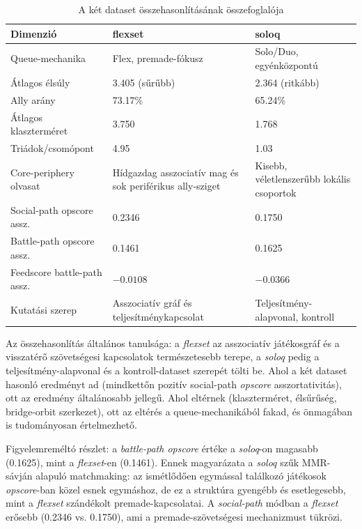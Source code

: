 \begin{table}[H]
\centering
\caption{A két dataset összehasonlításának összefoglalója}
\begin{tabularx}{\textwidth}{>{\raggedright\arraybackslash}p{5cm} X X}
\toprule
\textbf{Dimenzió} & \textbf{flexset} & \textbf{soloq} \\
\midrule
Queue-mechanika & Flex, premade-fókusz & Solo/Duo, egyénközpontú \\
Átlagos élsúly & 3.405 (sűrűbb) & 2.364 (ritkább) \\
Ally arány & 73.17\% & 65.24\% \\
Átlagos klaszterméret & 3.750 & 1.768 \\
Triádok/csomópont & 4.95 & 1.03 \\
Core-periphery olvasat & Hídgazdag asszociatív mag és sok periférikus ally-sziget & Kisebb, véletlenszerűbb lokális csoportok \\
Social-path opscore assz. & 0.2346 & 0.1750 \\
Battle-path opscore assz. & 0.1461 & 0.1625 \\
Feedscore battle-path assz. & $-0.0108$ & $-0.0366$ \\
Kutatási szerep & Asszociatív gráf és teljesítménykapcsolat & Teljesítmény-alapvonal, kontroll \\
\bottomrule
\end{tabularx}
\end{table}

Az összehasonlítás általános tanulsága: a \textit{flexset} az asszociatív játékosgráf és a visszatérő szövetségesi kapcsolatok természetesebb terepe, a \textit{soloq} pedig a teljesítmény-alapvonal és a kontroll-dataset szerepét tölti be. Ahol a két dataset hasonló eredményt ad (mindkettőn pozitív social-path \textit{opscore} asszortativitás), ott az eredmény általánosabb jellegű. Ahol eltérnek (klaszterméret, élsűrűség, bridge-orbit szerkezet), ott az eltérés a queue-mechanikából fakad, és önmagában is tudományosan értelmezhető.

Figyelemreméltó részlet: a \textit{battle-path opscore} értéke a \textit{soloq}-on magasabb (0.1625), mint a \textit{flexset}-en (0.1461). Ennek magyarázata a \textit{soloq} szűk MMR-sávján alapuló matchmaking: az ismétlődően egymással találkozó játékosok \textit{opscore}-ban közel esnek egymáshoz, de ez a struktúra gyengébb és esetlegesebb, mint a \textit{flexset} szándékolt premade-kapcsolatai. A \textit{social-path} módban a \textit{flexset} erősebb (0.2346 vs. 0.1750), ami a premade-szövetségesi mechanizmust tükrözi.
